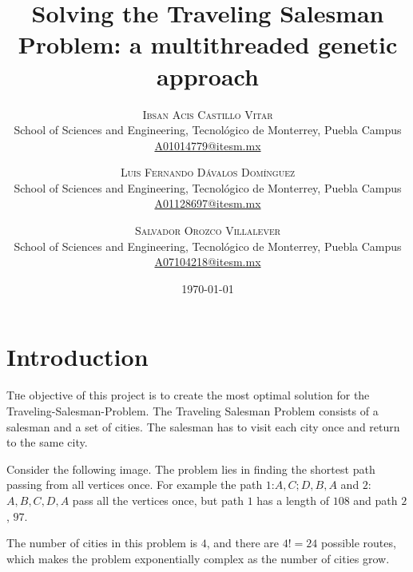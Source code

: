 \documentclass[twoside,twocolumn]{article}
\title{Solving the Traveling Salesman Problem: a multithreaded genetic approach} %
\author{%
  \textsc{Ibsan Acis Castillo Vitar} \\[1ex] %
  \normalsize School of Sciences and Engineering, Tecnológico de Monterrey, Puebla Campus \\ %
  \normalsize \href{mailto:A01014779@itesm.mx}{A01014779@itesm.mx} %
  \and %
  \textsc{Luis Fernando Dávalos Domínguez} \\[1ex] %
  \normalsize School of Sciences and Engineering, Tecnológico de Monterrey, Puebla Campus \\ %
  \normalsize \href{mailto:A01128697@itesm.mx}{A01128697@itesm.mx} %
  \and %
  \textsc{Salvador Orozco Villalever} \\[1ex] %
  \normalsize School of Sciences and Engineering, Tecnológico de Monterrey, Puebla Campus \\ %
  \normalsize \href{mailto:A07104218@itesm.mx}{A07104218@itesm.mx} %
  }
\date{\today} %
\begin{document}
  
  \maketitle
  
  
  \section{Introduction}
  
  \lettrine[nindent=0em,lines=3]{T}he objective of this project is to create the most optimal solution for the Traveling-Salesman-Problem. The Traveling Salesman Problem consists of a salesman and a set of cities. The salesman has to visit each city once and return to the same city.
  
  Consider the following image. The problem lies in finding the shortest path passing from all vertices once. For example the path $1$:${A,C;D,B,A}$ and $2$:${A,B,C,D,A}$ pass all the vertices once, but path $1$ has a length of $108$ and path $2$, $97$.\linebreak
  
      
  The number of cities in this problem is $4$, and there are $4! = 24$ possible routes, which makes the problem exponentially complex as the number of cities grow.\linebreak
  
\end{document}
